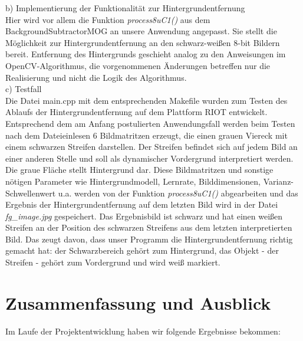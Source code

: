 \documentclass[10pt,a4paper]{article}
\begin{document}
b) Implementierung der Funktionalität zur Hintergrundentfernung \\

Hier wird vor allem die Funktion {\it process8uC1()} aus dem BackgroundSubtractorMOG an unsere Anwendung angepasst. Sie stellt die Möglichkeit zur Hintergrundentfernung an den schwarz-weißen 8-bit Bildern bereit. Entfernung des Hintergrunds geschieht analog zu den Anweisungen im OpenCV-Algorithmus, die vorgenommenen Änderungen betreffen nur die Realisierung und nicht die Logik des Algorithmus. \\

c) Testfall \\

Die Datei main.cpp mit dem entsprechenden Makefile wurden zum Testen des Ablaufs der Hintergrundentfernung auf dem Plattform RIOT entwickelt. Entsprechend dem am Anfang postulierten Anwendungsfall werden beim Testen nach dem Dateieinlesen 6 Bildmatritzen erzeugt, die einen grauen Viereck mit einem schwarzen Streifen darstellen. Der Streifen befindet sich auf jedem Bild an einer anderen Stelle und soll als dynamischer Vordergrund interpretiert werden. Die graue Fläche stellt Hintergrund dar. Diese Bildmatritzen und sonstige nötigen Parameter wie Hintergrundmodell, Lernrate, Bilddimensionen, Varianz-Schwellenwert u.a. werden von der Funktion {\it process8uC1()} abgearbeiten und das Ergebnis der Hintergrundentfernung auf dem letzten Bild wird in der Datei {\it fg\_image.jpg} gespeichert. Das Ergebnisbild ist schwarz und hat einen weißen Streifen an der Position des schwarzen Streifens aus dem letzten interpretierten Bild. Das zeugt davon, dass unser Programm die Hintergrundentfernung richtig gemacht hat: der Schwarzbereich gehört zum Hintergrund, das Objekt - der Streifen - gehört zum Vordergrund und wird weiß markiert.

\newpage
\section{Zusammenfassung und Ausblick}

Im Laufe der Projektentwicklung haben wir folgende Ergebnisse bekommen:
\end{document}
